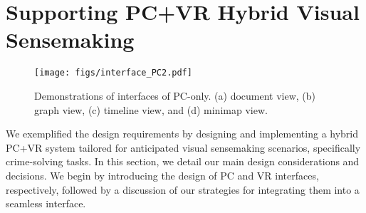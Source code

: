 \section{Supporting PC+VR Hybrid Visual Sensemaking}

\begin{figure}
\centering
\texttt{[image: figs/interface\_PC2.pdf]}
\caption{Demonstrations of interfaces of PC-only. (a) document view, (b) graph view, (c) timeline view, and (d) minimap view.}
\label{fig:pc_interface}
\end{figure}

We exemplified the design requirements by designing and implementing a hybrid PC+VR system tailored for anticipated visual sensemaking scenarios, specifically crime-solving tasks. 
In this section, we detail our main design considerations and decisions. We begin by introducing the design of PC and VR interfaces, respectively, followed by a discussion of our strategies for integrating them into a seamless interface.

